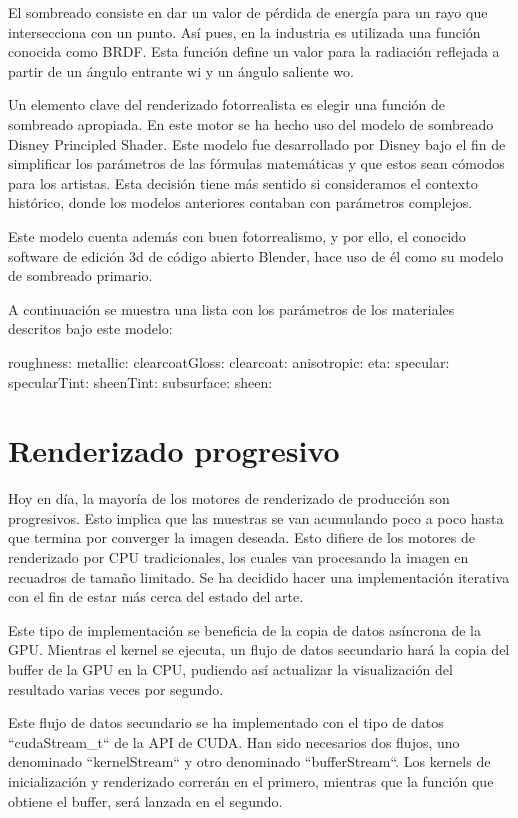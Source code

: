 		
	El sombreado consiste en dar un valor de pérdida de energía para un rayo que intersecciona con un punto. Así pues, en la industria es utilizada una función conocida como BRDF. Esta función define un valor para la radiación reflejada a partir de un ángulo entrante wi y un ángulo saliente wo.

	Un elemento clave del renderizado fotorrealista es elegir una función de sombreado apropiada. En este motor se ha hecho uso del modelo de sombreado Disney Principled Shader. Este modelo fue desarrollado por Disney bajo el fin de simplificar los parámetros de las fórmulas matemáticas y que estos sean cómodos para los artistas. Esta decisión tiene más sentido si consideramos el contexto histórico, donde los modelos anteriores contaban con parámetros complejos.

	Este modelo cuenta además con buen fotorrealismo, y por ello, el conocido software de edición 3d de código abierto Blender, hace uso de él como su modelo de sombreado primario.


	A continuación se muestra una lista con los parámetros de los materiales descritos bajo este modelo:

	roughness:
	metallic:
	clearcoatGloss:
	clearcoat:
	anisotropic:
	eta:
	specular:
	specularTint:
	sheenTint:
	subsurface:
	sheen:


	
	\section{Renderizado progresivo}
		
	Hoy en día, la mayoría de los motores de renderizado de producción son progresivos. Esto implica que las muestras se van acumulando poco a poco hasta que termina por converger la imagen deseada. Esto difiere de los motores de renderizado por CPU tradicionales, los cuales van procesando la imagen en recuadros de tamaño limitado. Se ha decidido hacer una implementación iterativa con el fin de estar más cerca del estado del arte.



	Este tipo de implementación se beneficia de la copia de datos asíncrona de la GPU. Mientras el kernel se ejecuta, un flujo de datos secundario hará la copia del buffer de la GPU en la CPU, pudiendo así actualizar la visualización del resultado varias veces por segundo.

	Este flujo de datos secundario se ha implementado con el tipo de datos ``cudaStream\_t`` de la API de CUDA. Han sido necesarios dos flujos, uno denominado ``kernelStream`` y otro denominado ``bufferStream``. Los kernels de inicialización y renderizado correrán en el primero, mientras que la función que obtiene el buffer, será lanzada en el segundo.

